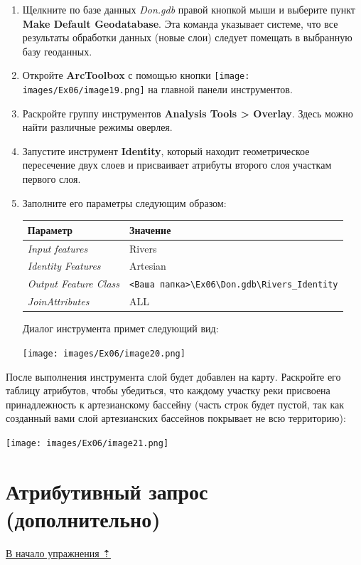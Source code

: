 \documentclass[12pt,]{book}
\begin{document}
\begin{enumerate}
\def\labelenumi{\arabic{enumi}.}
\item
  Щелкните по базе данных \emph{Don.gdb} правой кнопкой мыши и выберите пункт \textbf{Make Default Geodatabase}. Эта команда указывает системе, что все результаты обработки данных (новые слои) следует помещать в выбранную базу геоданных.
\item
  Откройте \textbf{ArcToolbox} с помощью кнопки \texttt{[image: images/Ex06/image19.png]} на главной панели инструментов.
\item
  Раскройте группу инструментов \textbf{Analysis Tools \textgreater{} Overlay}. Здесь можно найти различные режимы оверлея.
\item
  Запустите инструмент \textbf{Identity}, который находит геометрическое пересечение двух слоев и присваивает атрибуты второго слоя участкам первого слоя.
\item
  Заполните его параметры следующим образом:

  \begin{longtable}[]{@{}ll@{}}
  \toprule
  Параметр & Значение\tabularnewline
  \midrule
  \endhead
  \emph{Input features} & Rivers\tabularnewline
  \emph{Identity Features} & Artesian\tabularnewline
  \emph{Output Feature Class} & \texttt{\textless{}Ваша\ папка\textgreater{}\textbackslash{}Ex06\textbackslash{}Don.gdb\textbackslash{}Rivers\_Identity}\tabularnewline
  \emph{JoinAttributes} & ALL\tabularnewline
  \bottomrule
  \end{longtable}

  Диалог инструмента примет следующий вид:

  \texttt{[image: images/Ex06/image20.png]}
\end{enumerate}

После выполнения инструмента слой будет добавлен на карту. Раскройте его таблицу атрибутов, чтобы убедиться, что каждому участку реки присвоена принадлежность к артезианскому бассейну (часть строк будет пустой, так как созданный вами слой артезианских бассейнов покрывает не всю территорию):

\texttt{[image: images/Ex06/image21.png]}

\hypertarget{map-ref-hydrogeologic-attributes}{%
\section{Атрибутивный запрос (дополнительно)}\label{map-ref-hydrogeologic-attributes}}

\protect\hyperlink{map-ref-hydrogeologic}{В начало упражнения ⇡}
\end{document}
